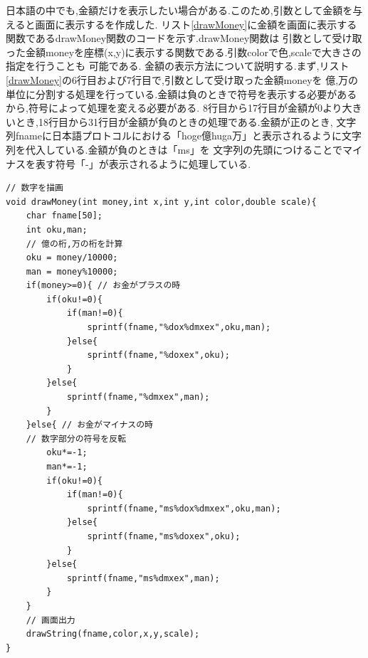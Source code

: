 \documentclass[a4j]{jarticle}
\begin{document}
    日本語の中でも,金額だけを表示したい場合がある.このため,引数として金額を与えると画面に表示するを作成した.
    リスト\ref{drawMoney}に金額を画面に表示する関数であるdrawMoney関数のコードを示す.drawMoney関数は
    引数として受け取った金額moneyを座標(x,y)に表示する関数である.引数colorで色,scaleで大きさの指定を行うことも
    可能である. 金額の表示方法について説明する.まず,リスト\ref{drawMoney}の6行目および7行目で,引数として受け取った金額moneyを
    億,万の単位に分割する処理を行っている.金額は負のときで符号を表示する必要があるから,符号によって処理を変える必要がある.
    8行目から17行目が金額が0より大きいとき,18行目から31行目が金額が負のときの処理である.金額が正のとき,
    文字列fnameに日本語プロトコルにおける「hoge億huga万」と表示されるように文字列を代入している.金額が負のときは「ms」を
    文字列の先頭につけることでマイナスを表す符号「-」が表示されるように処理している.
    \begin{lstlisting}[basicstyle=\ttfamily\footnotesize, frame=single,label=drawMoney,caption=drawMoney関数]
// 数字を描画
void drawMoney(int money,int x,int y,int color,double scale){
    char fname[50];
    int oku,man;
    // 億の桁,万の桁を計算
    oku = money/10000;
    man = money%10000;
    if(money>=0){ // お金がプラスの時
        if(oku!=0){
            if(man!=0){
                sprintf(fname,"%dox%dmxex",oku,man);
            }else{
                sprintf(fname,"%doxex",oku);
            }
        }else{
            sprintf(fname,"%dmxex",man);
        }
    }else{ // お金がマイナスの時
    // 数字部分の符号を反転
        oku*=-1;
        man*=-1;
        if(oku!=0){
            if(man!=0){
                sprintf(fname,"ms%dox%dmxex",oku,man);
            }else{
                sprintf(fname,"ms%doxex",oku);
            }
        }else{
            sprintf(fname,"ms%dmxex",man);
        }        
    }
    // 画面出力
    drawString(fname,color,x,y,scale);
}  
    \end{lstlisting} 
\end{document}

